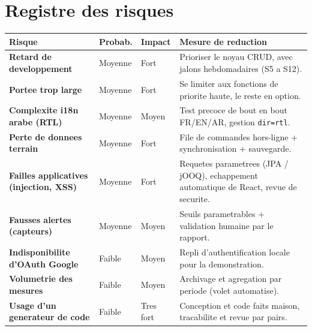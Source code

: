 \section{Registre des risques}
\begin{xltabular}{\textwidth}{>{\bfseries}p{4.6cm} C{1.8cm} C{1.6cm} X}
\toprule
\textbf{Risque} & \textbf{Probab.} & \textbf{Impact} & \textbf{Mesure de reduction} \\
\midrule
\endhead
Retard de developpement       & Moyenne & Fort      & Prioriser le noyau CRUD, avec jalons hebdomadaires (S5 a S12). \\
Portee trop large             & Moyenne & Fort      & Se limiter aux fonctions de priorite haute, le reste en option. \\
Complexite i18n arabe (RTL)   & Moyenne & Moyen     & Test precoce de bout en bout FR/EN/AR, gestion \texttt{dir=rtl}. \\
Perte de donnees terrain      & Moyenne & Fort      & File de commandes hors-ligne + synchronisation + sauvegarde. \\
Failles applicatives (injection, XSS) & Moyenne & Fort & Requetes parametrees (JPA / jOOQ), echappement automatique de React, revue de securite. \\
Fausses alertes (capteurs)    & Moyenne & Moyen     & Seuils parametrables + validation humaine par le rapport. \\
Indisponibilite d'OAuth Google & Faible & Moyen     & Repli d'authentification locale pour la demonstration. \\
Volumetrie des mesures        & Faible  & Moyen     & Archivage et agregation par periode (volet automatise). \\
Usage d'un generateur de code & Faible  & Tres fort & Conception et code faits maison, tracabilite et revue par pairs. \\
\bottomrule
\end{xltabular}

